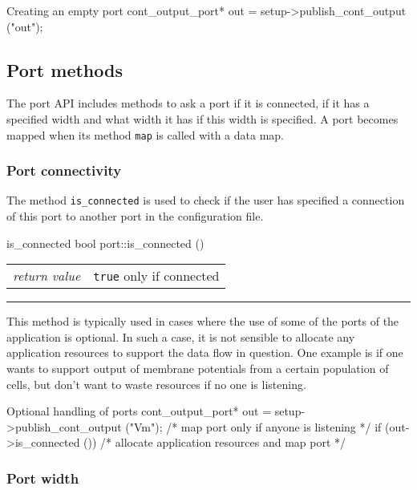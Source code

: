 \documentclass[a4paper]{report}
\makeatletter
\newenvironment{parameters}%
{\begin{tabular}{@{\hspace{2em}}lp{0.6\textwidth}}}%
{\end{tabular}\par\vspace{1mm}\par\hrule\par\vspace{5mm}}
\makeatother
\begin{document}
\begin{code}{Creating an empty port}
cont_output_port* out =
   setup->publish_cont_output ("out");
\end{code}

\subsection{Port methods}

The port API includes methods to ask a port if it is connected, if it
has a specified width and what width it has if this width is
specified.  A port becomes mapped when its method \lstinline|map| is
called with a data map.

\subsubsection{Port connectivity}

The method \lstinline|is_connected| is used to check if the user has
specified a connection of this port to another port in the
configuration file.

\begin{head}{is_connected}
  bool port::is_connected ()
\end{head}
\begin{parameters}
  \emph{return value} & \lstinline|true| only if connected\\
\end{parameters}

This method is typically used in cases where the use of some of the
ports of the application is optional.  In such a case, it is not
sensible to allocate any application resources to support the data
flow in question.  One example is if one wants to support output of
membrane potentials from a certain population of cells, but don't want
to waste resources if no one is listening.

\pagebreak
\begin{code}{Optional handling of ports}
cont_output_port* out =
   setup->publish_cont_output ("Vm");
/* map port only if anyone is listening */
if (out->is_connected ())
  /* allocate application resources and map port */
\end{code}

\subsubsection{Port width}
\label{sec:width}
\end{document}
